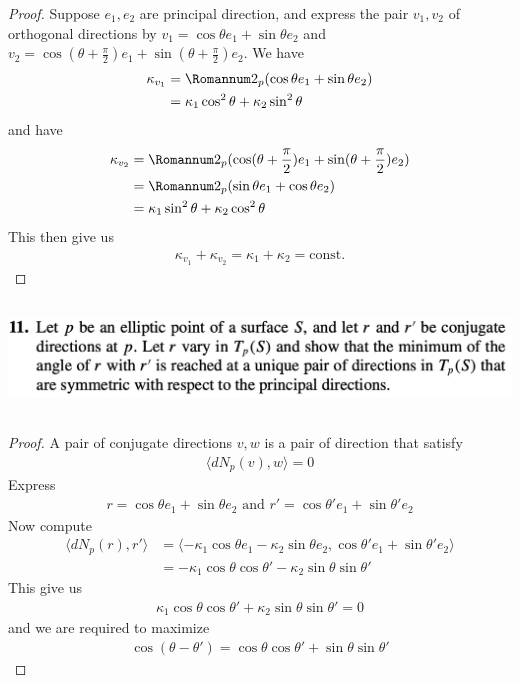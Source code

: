 \documentclass{report}
\begin{document}
\begin{proof}
Suppose $e_1,e_2$ are principal direction, and express the pair $v_1,v_2$ of orthogonal directions by  $v_1=\cos \theta e_1+ \sin \theta e_2$ and $v_2=\cos (\theta + \frac{\pi}{2}) e_1+ \sin (\theta + \frac{\pi}{2}) e_2$. We have 
\begin{align*}
\kappa_{v_1}&=\Sec_p (\cos \theta e_1+\sin \theta e_2)\\
&=\kappa_1 \cos^2 \theta + \kappa_2 \sin^2 \theta
\end{align*}
and have 
\begin{align*}
\kappa_{v_2}&=\Sec_p(\cos (\theta + \frac{\pi}{2})e_1+ \sin (\theta + \frac{\pi}{2})e_2)\\
&=\Sec_p (\sin \theta e_1+\cos \theta e_2)\\
&=\kappa_1 \sin^2 \theta + \kappa_2\cos^2 \theta 
\end{align*}
This then give us 
\begin{align*}
\kappa_{v_1}+\kappa_{v_2}= \kappa_1+ \kappa_2=\text{const.}
\end{align*}
\end{proof}

\begin{question}{}{}
\includegraphics[height=3cm,width=18cm]{hw5q5}
\end{question}
\begin{proof}
A pair of conjugate directions $v,w$ is a pair of direction that satisfy 
\begin{align*}
\langle dN_p(v),w\rangle  = 0
\end{align*}
Express 
\begin{align*}
r=\cos \theta e_1+ \sin \theta e_2\text{ and }r'=\cos \theta' e_1+ \sin \theta' e_2
\end{align*}
Now compute 
\begin{align*}
\langle dN_p(r),r'\rangle &= \langle -\kappa_1 \cos \theta e_1- \kappa_2 \sin \theta e_2, \cos \theta ' e_1+ \sin \theta' e_2 \rangle \\
&=- \kappa_1 \cos \theta \cos \theta '- \kappa_2 \sin \theta \sin \theta'
\end{align*}
This give us 
\begin{align*}
\kappa_1 \cos \theta \cos \theta' + \kappa_2 \sin \theta \sin \theta ' =0 \end{align*}
and we are required to maximize 
\begin{align*}
\cos (\theta - \theta ' )=\cos \theta \cos \theta'+\sin \theta \sin \theta' 
\end{align*}




\end{proof}
\end{document}
